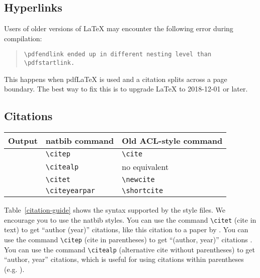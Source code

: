 \documentclass[11pt]{article}
\begin{document}
\subsection{Hyperlinks}

Users of older versions of \LaTeX{} may encounter the following error during compilation: 
\begin{quote}
	\tt\verb|\pdfendlink| ended up in different nesting level than \verb|\pdfstartlink|.
\end{quote}
This happens when pdf\LaTeX{} is used and a citation splits across a page boundary. The best way to fix this is to upgrade \LaTeX{} to 2018-12-01 or later.

\subsection{Citations}

\begin{table*}
	\centering
	\begin{tabular}{lll}
		\hline
		\textbf{Output} & \textbf{natbib command} & \textbf{Old ACL-style command}\\
		\hline
		\citep{Gusfield:97} & \verb|\citep| & \verb|\cite| \\
		\citealp{Gusfield:97} & \verb|\citealp| & no equivalent \\
		\citet{Gusfield:97} & \verb|\citet| & \verb|\newcite| \\
		\citeyearpar{Gusfield:97} & \verb|\citeyearpar| & \verb|\shortcite| \\
		\hline
	\end{tabular}
	\caption{\label{citation-guide}
		Citation commands supported by the style file.
		The style is based on the natbib package and supports all natbib citation commands.
		It also supports commands defined in previous ACL style files for compatibility.
	}
\end{table*}

Table~\ref{citation-guide} shows the syntax supported by the style files.
We encourage you to use the natbib styles.
You can use the command \verb|\citet| (cite in text) to get ``author (year)'' citations, like this citation to a paper by \citet{Gusfield:97}.
You can use the command \verb|\citep| (cite in parentheses) to get ``(author, year)'' citations \citep{Gusfield:97}.
You can use the command \verb|\citealp| (alternative cite without parentheses) to get ``author, year'' citations, which is useful for using citations within parentheses (e.g. \citealp{Gusfield:97}).
\end{document}
